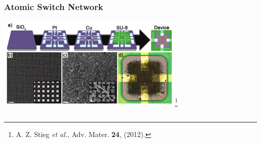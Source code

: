 \documentclass[mathserif]{beamer}
\begin{document}
\begin{frame}
\begin{columns}
\begin{center}

\end{center}
\end{columns}
\end{frame}

\begin{frame}
\frametitle{Atomic Switch Network}

\begin{center}
\includegraphics[width=9cm]{ASN_fabrication.png}\footnote{A. Z. Stieg \emph{et al.}, Adv. Mater. \textbf{24}, (2012).}
\end{center}

\begin{columns}
\centering
{}
\centering
{}
\end{columns}

\end{frame}
\end{document}
